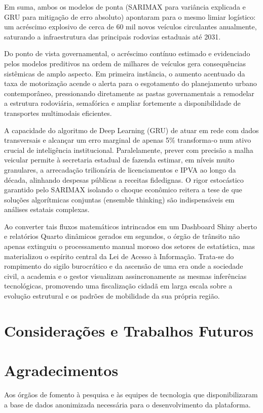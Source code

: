 \documentclass[12pt,a4paper]{article}
\begin{document}
Em suma, ambos os modelos de ponta (SARIMAX para variância explicada e GRU para mitigação de erro absoluto) apontaram para o mesmo limiar logístico: um acréscimo explosivo de cerca de 60 mil novos veículos circulantes anualmente, saturando a infraestrutura das principais rodovias estaduais até 2031.

Do ponto de vista governamental, o acréscimo contínuo estimado e evidenciado pelos modelos preditivos na ordem de milhares de veículos gera consequências sistêmicas de amplo aspecto. Em primeira instância, o aumento acentuado da taxa de motorização acende o alerta para o esgotamento do planejamento urbano contemporâneo, pressionando diretamente as pastas governamentais a remodelar a estrutura rodoviária, semafórica e ampliar fortemente a disponibilidade de transportes multimodais eficientes.

A capacidade do algoritmo de Deep Learning (GRU) de atuar em rede com dados transversais e alcançar um erro marginal de apenas 5\% transforma-o num ativo crucial de inteligência institucional. Paralelamente, prever com precisão a malha veicular permite à secretaria estadual de fazenda estimar, em níveis muito granulares, a arrecadação trilionária de licenciamentos e IPVA ao longo da década, alinhando despesas públicas a receitas fidedignas. O rigor estocástico garantido pelo SARIMAX isolando o choque econômico reitera a tese de que soluções algorítmicas conjuntas (ensemble thinking) são indispensáveis em análises estatais complexas.

Ao converter tais fluxos matemáticos intrincados em um Dashboard Shiny aberto e relatórios Quarto dinâmicos gerados em segundos, o órgão de trânsito não apenas extinguiu o processamento manual moroso dos setores de estatística, mas materializou o espírito central da Lei de Acesso à Informação. Trata-se do rompimento do sigilo burocrático e da ascensão de uma era onde a sociedade civil, a academia e o gestor visualizam assincronamente as mesmas inferências tecnológicas, promovendo uma fiscalização cidadã em larga escala sobre a evolução estrutural e os padrões de mobilidade da sua própria região.


\section{Considerações e Trabalhos Futuros}
\label{sec:conclui}


\section*{Agradecimentos}
Aos órgãos de fomento à pesquisa e às equipes de tecnologia que disponibilizaram a base de dados anonimizada necessária para o desenvolvimento da plataforma.
\end{document}
